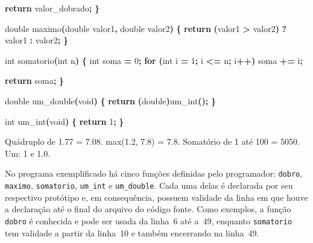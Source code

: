 \documentclass[
  11pt,
  a4paper,
]{scrbook}
\newenvironment{Shaded}{\begin{snugshade}}{\end{snugshade}}
\newcommand{\ControlFlowTok}[1]{\textcolor[rgb]{0.13,0.29,0.53}{\textbf{#1}}}
\newcommand{\DataTypeTok}[1]{\textcolor[rgb]{0.13,0.29,0.53}{#1}}
\newcommand{\DecValTok}[1]{\textcolor[rgb]{0.00,0.00,0.81}{#1}}
\newcommand{\NormalTok}[1]{#1}
\newcommand{\OperatorTok}[1]{\textcolor[rgb]{0.81,0.36,0.00}{\textbf{#1}}}
\begin{document}
\begin{Shaded}
\begin{Highlighting}[numbers=left,,]
    \ControlFlowTok{return}\NormalTok{ valor\_dobrado}\OperatorTok{;}
\OperatorTok{\}}

\DataTypeTok{double}\NormalTok{ maximo}\OperatorTok{(}\DataTypeTok{double}\NormalTok{ valor1}\OperatorTok{,} \DataTypeTok{double}\NormalTok{ valor2}\OperatorTok{)} \OperatorTok{\{}
    \ControlFlowTok{return} \OperatorTok{(}\NormalTok{valor1 }\OperatorTok{\textgreater{}}\NormalTok{ valor2}\OperatorTok{)} \OperatorTok{?}\NormalTok{ valor1 }\OperatorTok{:}\NormalTok{ valor2}\OperatorTok{;}
\OperatorTok{\}}

\DataTypeTok{int}\NormalTok{ somatorio}\OperatorTok{(}\DataTypeTok{int}\NormalTok{ n}\OperatorTok{)} \OperatorTok{\{}
    \DataTypeTok{int}\NormalTok{ soma }\OperatorTok{=} \DecValTok{0}\OperatorTok{;}
    \ControlFlowTok{for} \OperatorTok{(}\DataTypeTok{int}\NormalTok{ i }\OperatorTok{=} \DecValTok{1}\OperatorTok{;}\NormalTok{ i }\OperatorTok{\textless{}=}\NormalTok{ n}\OperatorTok{;}\NormalTok{ i}\OperatorTok{++)}
\NormalTok{        soma }\OperatorTok{+=}\NormalTok{ i}\OperatorTok{;}

    \ControlFlowTok{return}\NormalTok{ soma}\OperatorTok{;}
\OperatorTok{\}}

\DataTypeTok{double}\NormalTok{ um\_double}\OperatorTok{(}\DataTypeTok{void}\OperatorTok{)} \OperatorTok{\{}
    \ControlFlowTok{return} \OperatorTok{(}\DataTypeTok{double}\OperatorTok{)}\NormalTok{um\_int}\OperatorTok{();}
\OperatorTok{\}}

\DataTypeTok{int}\NormalTok{ um\_int}\OperatorTok{(}\DataTypeTok{void}\OperatorTok{)} \OperatorTok{\{}
    \ControlFlowTok{return} \DecValTok{1}\OperatorTok{;}
\OperatorTok{\}}
\end{Highlighting}
\end{Shaded}

\begin{Shaded}
\begin{Highlighting}[]
\NormalTok{Quádruplo de 1.77 = 7.08.}
\NormalTok{max(1.2, 7.8) = 7.8.}
\NormalTok{Somatório de 1 até 100 = 5050.}
\NormalTok{Um: 1 e 1.0.}
\end{Highlighting}
\end{Shaded}

No programa exemplificado há cinco funções definidas pelo programador:
\texttt{dobro}, \texttt{maximo}, \texttt{somatorio}, \texttt{um\_int} e
\texttt{um\_double}. Cada uma delas é declarada por seu respectivo
protótipo e, em consequência, possuem validade da linha em que houve a
declaração até o final do arquivo do código fonte. Como exemplos, a
função \texttt{dobro} é conhecida e pode ser usada da linha~6 até a~49,
enquanto \texttt{somatorio} tem validade a partir da linha~10 e também
encerrando na linha~49.
\end{document}
